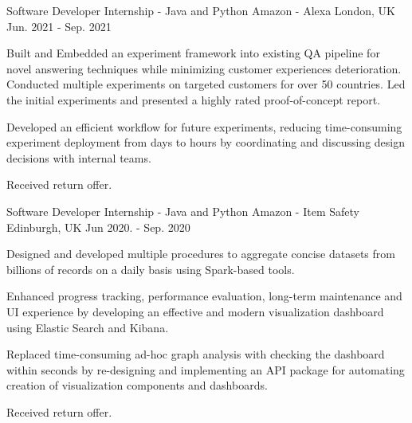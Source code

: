 

\begin{cventries}

  \cventry
    {Software Developer Internship - Java and Python} %
    {Amazon - Alexa} %
    {London, UK} %
    {Jun. 2021 - Sep. 2021} %
    {
      \begin{cvitems} %
        \item {Built and Embedded an experiment framework into existing QA pipeline for novel answering techniques while minimizing customer experiences deterioration. Conducted multiple experiments on targeted customers for over 50 countries. Led the initial experiments and presented a highly rated proof-of-concept report.}
        \item {Developed an efficient workflow for future experiments, reducing time-consuming experiment deployment from days to hours by coordinating and discussing design decisions with internal teams.}
        \item {Received return offer.}
      \end{cvitems}
    }

  \cventry
    {Software Developer Internship - Java and Python} %
    {Amazon - Item Safety} %
    {Edinburgh, UK} %
    {Jun 2020. - Sep. 2020} %
    {
      \begin{cvitems} %
        \item {Designed and developed multiple procedures to aggregate concise datasets from  billions of records on a daily basis using Spark-based tools.}
        \item{Enhanced progress tracking, performance evaluation, long-term maintenance and UI experience by developing an effective and modern visualization dashboard using Elastic Search and Kibana.}
        \item {Replaced time-consuming ad-hoc graph analysis with checking the dashboard within seconds by re-designing and implementing an API package for automating creation of visualization components and dashboards.}
        \item {Received return offer.}
      \end{cvitems}
    }


\end{cventries}
